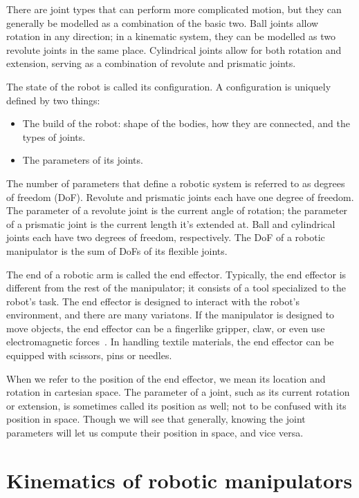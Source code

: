 There are joint types that can perform more complicated motion, but they can generally be modelled as a combination of the basic two. Ball joints allow rotation in any direction; in a kinematic system, they can be modelled as two revolute joints in the same place. Cylindrical joints allow for both rotation and extension, serving as a combination of revolute and prismatic joints.

The state of the robot is called its configuration. A configuration is uniquely defined by two things:
\begin{itemize}
  \item The build of the robot: shape of the bodies, how they are connected, and the types of joints.
  \item The parameters of its joints.
\end{itemize}

The number of parameters that define a robotic system is referred to as degrees of freedom (DoF). Revolute and prismatic joints each have one degree of freedom. The parameter of a revolute joint is the current angle of rotation; the parameter of a prismatic joint is the current length it's extended at. Ball and cylindrical joints each have two degrees of freedom, respectively. The DoF of a robotic manipulator is the sum of DoFs of its flexible joints.

The end of a robotic arm is called the end effector. Typically, the end effector is different from the rest of the manipulator; it consists of a tool specialized to the robot's task. The end effector is designed to interact with the robot's environment, and there are many variatons. If the manipulator is designed to move objects, the end effector can be a fingerlike gripper, claw, or even use electromagnetic forces~\cite{grippers}. In handling textile materials, the end effector can be equipped with scissors, pins or needles.

When we refer to the position of the end effector, we mean its location and rotation in cartesian space. The parameter of a joint, such as its current rotation or extension, is sometimes called its position as well; not to be confused with its position in space. Though we will see that generally, knowing the joint parameters will let us compute their position in space, and vice versa.

\section{Kinematics of robotic manipulators}

